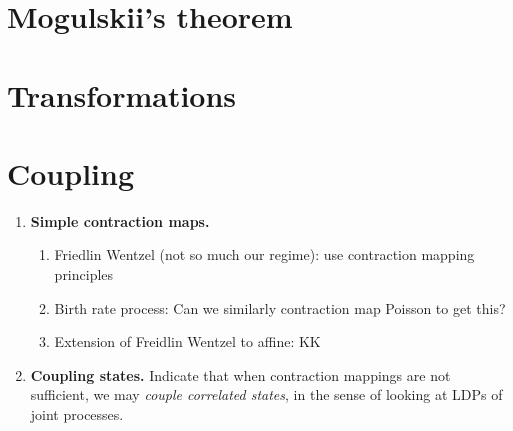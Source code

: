 

\section{Mogulskii's theorem}


\section{Transformations}


\section{Coupling}

\begin{enumerate}
  \item
    {\bfseries Simple contraction maps.}
    \begin{enumerate}
      \item
        Friedlin Wentzel (not so much our regime): use contraction mapping principles
      \item
        Birth rate process: Can we similarly contraction map Poisson to get this?
      \item
        Extension of Freidlin Wentzel to affine: KK
    \end{enumerate}
  \item
    {\bfseries Coupling states.}
    Indicate that when contraction mappings are not sufficient, we may \emph{couple correlated states}, in the sense of looking at LDPs of joint processes.
    \begin{enumerate}

\end{enumerate}
\end{enumerate}
